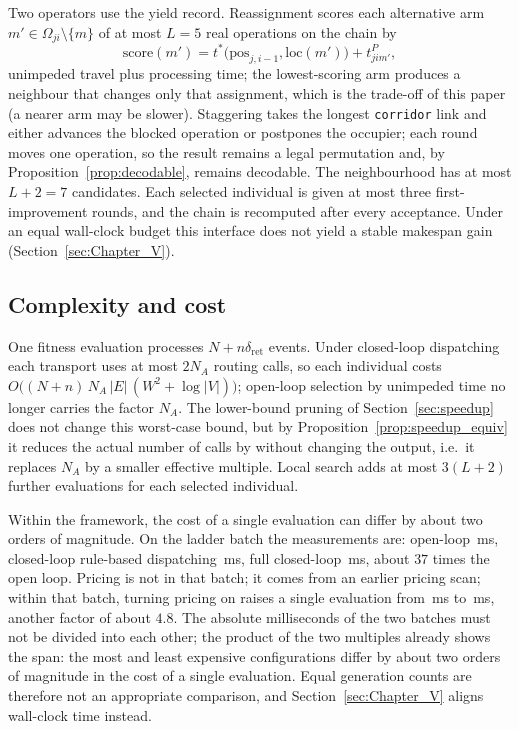 Two operators use the yield record.
Reassignment scores each alternative arm $m'\in\Omega_{ji}\setminus\{m\}$ of at most $L=5$ real operations on the chain by
\begin{equation}
\label{eq:reassign}
\mathrm{score}(m')=t^{*}\bigl(\mathrm{pos}_{j,i-1},\mathrm{loc}(m')\bigr)
+t^{P}_{jim'},
\end{equation}
unimpeded travel plus processing time; the lowest-scoring arm produces a neighbour that changes only that assignment, which is the trade-off of this paper (a nearer arm may be slower).
Staggering takes the longest \texttt{corridor} link and either advances the blocked operation or postpones the occupier; each round moves one operation, so the result remains a legal permutation and, by Proposition~\ref{prop:decodable}, remains decodable.
The neighbourhood has at most $L+2=7$ candidates.
Each selected individual is given at most three first-improvement rounds, and the chain is recomputed after every acceptance.
Under an equal wall-clock budget this interface does not yield a stable makespan gain (Section~\ref{sec:Chapter_V}).

\subsection{Complexity and cost}
\label{sec:complexity}

One fitness evaluation processes $N+n\delta_{\mathrm{ret}}$ events.
Under closed-loop dispatching each transport uses at most $2N_A$ routing calls, so each individual costs
$O\bigl((N+n)\,N_A\,|E|\,(W^{2}+\log|V|)\bigr)$; open-loop selection by unimpeded time no longer carries the factor $N_A$.
The lower-bound pruning of Section~\ref{sec:speedup} does not change this worst-case bound, but by Proposition~\ref{prop:speedup_equiv} it reduces the actual number of calls by \RouteCallCut{} without changing the output, i.e.\ it replaces $N_A$ by a smaller effective multiple.
Local search adds at most $3(L+2)$ further evaluations for each selected individual.

Within the framework, the cost of a single evaluation can differ by about two orders of magnitude.
On the ladder batch the measurements are: open-loop \MsOpen{}\,ms, closed-loop rule-based dispatching \MsLoopRule{}\,ms, full closed-loop \MsLoopProbe{}\,ms, about $37$ times the open loop.
Pricing is not in that batch; it comes from an earlier pricing scan; within that batch, turning pricing on raises a single evaluation from \MsPricedRef{}\,ms to \MsPriced{}\,ms, another factor of about $4.8$.
The absolute milliseconds of the two batches must not be divided into each other; the product of the two multiples already shows the span: the most and least expensive configurations differ by about two orders of magnitude in the cost of a single evaluation.
Equal generation counts are therefore not an appropriate comparison, and Section~\ref{sec:Chapter_V} aligns wall-clock time instead.

